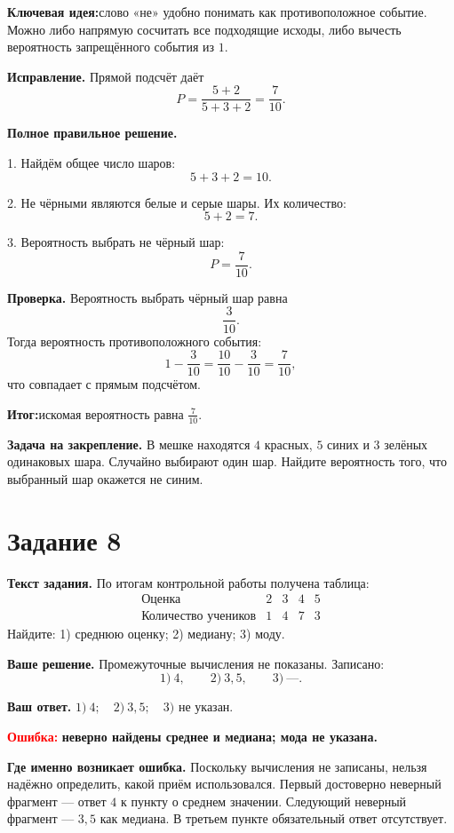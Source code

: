 \documentclass[12pt,a4paper]{article}
\newcommand{\errlabel}[1]{\textcolor{red}{\textbf{Ошибка:}} \textbf{#1}}
\newcommand{\keyidea}{\textcolor{blue!60!black}{\textbf{Ключевая идея:}}}
\newcommand{\outcome}{\textcolor{teal!60!black}{\textbf{Итог:}}}
\begin{document}
\keyidea слово «не» удобно понимать как противоположное событие. Можно либо напрямую сосчитать все подходящие исходы, либо вычесть вероятность запрещённого события из $1$.

\textbf{Исправление.}
Прямой подсчёт даёт
\[
P=\frac{5+2}{5+3+2}=\frac7{10}.
\]

\textbf{Полное правильное решение.}

1. Найдём общее число шаров:
\[
5+3+2=10.
\]

2. Не чёрными являются белые и серые шары. Их количество:
\[
5+2=7.
\]

3. Вероятность выбрать не чёрный шар:
\[
P=\frac7{10}.
\]

\textbf{Проверка.}
Вероятность выбрать чёрный шар равна
\[
\frac3{10}.
\]
Тогда вероятность противоположного события:
\[
1-\frac3{10}=\frac{10}{10}-\frac3{10}=\frac7{10},
\]
что совпадает с прямым подсчётом.

\outcome искомая вероятность равна $\frac7{10}$.

\textbf{Задача на закрепление.}
В мешке находятся $4$ красных, $5$ синих и $3$ зелёных одинаковых шара. Случайно выбирают один шар. Найдите вероятность того, что выбранный шар окажется не синим.

\newpage
{}\label{task:8}
\section*{Задание 8}

\textbf{Текст задания.}
По итогам контрольной работы получена таблица:
\[
\begin{array}{c|cccc}
\text{Оценка} & 2 & 3 & 4 & 5 \\
\hline
\text{Количество учеников} & 1 & 4 & 7 & 3
\end{array}
\]
Найдите: 1) среднюю оценку; 2) медиану; 3) моду.

\textbf{Ваше решение.}
Промежуточные вычисления не показаны. Записано:
\[
1)\ 4,\qquad 2)\ 3{,}5,\qquad 3)\ \text{---}.
\]

\textbf{Ваш ответ.}
$1)\ 4;\quad 2)\ 3{,}5;\quad 3)$ не указан.

\errlabel{неверно найдены среднее и медиана; мода не указана.}

\textbf{Где именно возникает ошибка.}
Поскольку вычисления не записаны, нельзя надёжно определить, какой приём использовался. Первый достоверно неверный фрагмент --- ответ $4$ к пункту о среднем значении. Следующий неверный фрагмент --- $3{,}5$ как медиана. В третьем пункте обязательный ответ отсутствует.
\end{document}
